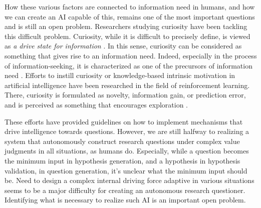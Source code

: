 How these various factors are connected to information need in humans, and how we can create an AI capable of this, remains one of the most important questions and is still an open problem. Researchers studying curiosity have been tackling this difficult problem. Curiosity, while it is difficult to precisely define, is viewed as \textit{a drive state for information} \cite{kidd2015psychology}. In this sense, curiosity can be considered as something that gives rise to an information need. Indeed, especially in the process of information-seeking, it is characterized as one of the precursors of information need \cite{case2016looking}. Efforts to instill curiosity \cite{schmidhuber1991possibility} or knowledge-based intrinsic motivation \cite{oudeyer2007intrinsic} in artificial intelligence have been researched in the field of reinforcement learning. There, curiosity is formulated as novelty, information gain, or prediction error, and is perceived as something that encourages exploration \cite{aubret2019survey}.

These efforts have provided guidelines on how to implement mechanisms that drive intelligence towards questions. However, we are still halfway to realizing a system that autonomously construct research questions under complex value judgments in all situations, as humans do. Especially, while a question becomes the minimum input in hypothesis generation, and a hypothesis in hypothesis validation, in question generation, it's unclear what the minimum input should be. Need to design a complex internal driving force adaptive in various situations seems to be a major difficulty for creating an autonomous research questioner. Identifying what is necessary to realize such AI is an important open problem.


